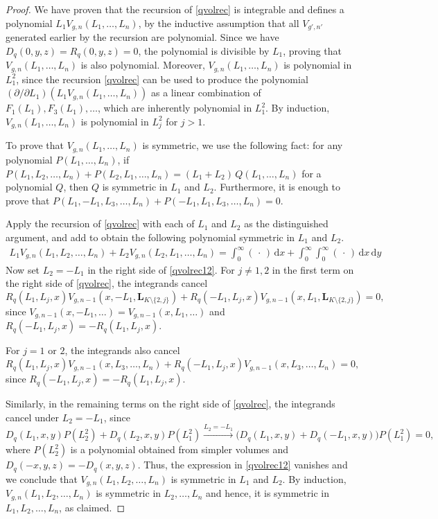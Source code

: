 \documentclass[a4paper]{article}
\theoremstyle{plain}
\theoremstyle{definition}
\newcommand{\dd}{\mathrm{d}}
\newcommand{\LL}{\bm{L}}
\begin{document}
\begin{proof}
We have proven that the recursion of \cref{qvolrec} is integrable and defines a polynomial $L_1V_{g,n}(L_1, \ldots, L_n)$, by the inductive assumption that all $V_{g',n'}$ generated earlier by the recursion are polynomial. Since we have $D_q(0,y,z)=R_q(0,y,z) = 0$, the polynomial is divisible by $L_1$, proving that $V_{g,n}(L_1, \ldots, L_n)$ is also polynomial. Moreover, $V_{g,n}(L_1, \ldots, L_n)$ is polynomial in $L_1^2$, since the recursion \eqref{qvolrec} can be used to produce the polynomial $(\partial/\partial L_1)(L_1V_{g,n}(L_1, \ldots, L_n))$ as a linear combination of $F_1(L_1), F_3(L_1), \ldots$, which are inherently polynomial in $L_1^2$.   By induction, $V_{g,n}(L_1, \ldots, L_n)$ is polynomial in $L_j^2$ for $j>1$.


To prove that $V_{g,n}(L_1, \ldots, L_n)$ is symmetric, we use the following fact: for any polynomial $P(L_1, \ldots, L_n)$, if $P(L_1,L_2, \ldots, L_n)+P(L_2,L_1, \ldots, L_n)=(L_1+L_2) \, Q(L_1, \ldots, L_n)$ for a polynomial $Q$, then $Q$ is symmetric in $L_1$ and $L_2$. Furthermore, it is enough to prove that $P(L_1,-L_1,L_3, \ldots, L_n)+P(-L_1,L_1,L_3, \ldots, L_n)=0$.


Apply the recursion of \cref{qvolrec} with each of $L_1$ and $L_2$ as the distinguished argument, and add to obtain the following polynomial symmetric in $L_1$ and $L_2$.
\begin{align} \label{qvolrec12}
L_1V_{g,n}(L_1,L_2, \ldots, L_n)+L_2V_{g,n}(L_2,L_1, \ldots, L_n)=\int_0^\infty \!\! (\,\cdot\,) \, \dd x +\int_0^\infty \!\! \int_0^\infty \!\! (\,\cdot\,) \, \dd x \, \dd y
\end{align}
Now set $L_2=-L_1$ in the right side of \cref{qvolrec12}. For $j\neq1,2$ in the first term on the right side of \cref{qvolrec}, the integrands cancel
\[
R_q(L_1,L_j,x)V_{g,n-1}(x,-L_1, \LL_{K \setminus \{2, j\}})+R_q(-L_1,L_j,x)V_{g,n-1}(x,L_1, \LL_{K \setminus \{2,j\}})=0,
\]
since $V_{g,n-1}(x,-L_1, \ldots)=V_{g,n-1}(x,L_1, \ldots)$ and $R_q(-L_1,L_j,x)=-R_q(L_1,L_j,x)$.


For $j=1$ or $2$, the integrands also cancel
\[
R_q(L_1,L_j,x)V_{g,n-1}(x,L_3, \ldots, L_n)+R_q(-L_1,L_j,x)V_{g,n-1}(x,L_3, \ldots, L_n)=0,
\]
since $R_q(-L_1,L_j,x)=-R_q(L_1,L_j,x)$.


Similarly, in the remaining terms on the right side of \cref{qvolrec}, the integrands cancel under $L_2=-L_1$, since 
\[
D_q(L_1,x,y)P(L_2^2)+D_q(L_2,x,y)P(L_1^2) \stackrel{L_2=-L_1}{\longrightarrow} \big( D_q(L_1,x,y)+D_q(-L_1,x,y) \big) P(L_1^2)=0,
\]
where $P(L_2^2)$ is a polynomial obtained from simpler volumes and $D_q(-x,y,z)=-D_q(x,y,z)$. Thus, the expression in \cref{qvolrec12} vanishes and we conclude that $V_{g,n}(L_1,L_2, \ldots, L_n)$ is symmetric in $L_1$ and $L_2$. By induction, $V_{g,n}(L_1,L_2, \ldots, L_n)$ is symmetric in $L_2, \ldots, L_n$ and hence, it is symmetric in $L_1,L_2, \ldots, L_n$, as claimed.
\end{proof}
\end{document}
